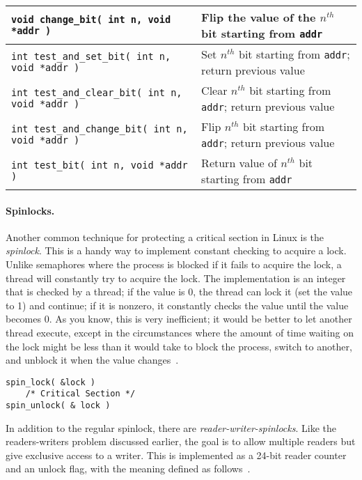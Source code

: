 \begin{center}
\begin{tabular}{l|l}
\texttt{void change\_bit( int n, void *addr )} &  Flip the value of the $n^{th}$ bit starting from \texttt{addr}\\\hline

\texttt{int test\_and\_set\_bit( int n, void *addr )} &  Set $n^{th}$ bit starting from \texttt{addr}; return previous value\\\hline

\texttt{int test\_and\_clear\_bit( int n, void *addr )} &  Clear $n^{th}$ bit starting from \texttt{addr}; return previous value\\\hline

\texttt{int test\_and\_change\_bit( int n, void *addr )} &  Flip $n^{th}$ bit starting from \texttt{addr}; return previous value\\\hline

\texttt{int test\_bit( int n, void *addr )} &  Return value of $n^{th}$ bit starting from \texttt{addr}\\\hline

\end{tabular}
\end{center}

\paragraph{Spinlocks.}
Another common technique for protecting a critical section in Linux is the \textit{spinlock}. This is a handy way to implement constant checking to acquire a lock. Unlike semaphores where the process is blocked if it fails to acquire the lock, a thread will constantly try to acquire the lock. The implementation is an integer that is checked by a thread; if the value is 0, the thread can lock it (set the value to 1) and continue; if it is nonzero, it constantly checks the value until the value becomes 0. As you know, this is very inefficient; it would be better to let another thread execute, except in the circumstances where the amount of time waiting on the lock might be less than it would take to block the process, switch to another, and unblock it when the value changes~\cite{osi}.

\begin{verbatim}
spin_lock( &lock )
    /* Critical Section */
spin_unlock( & lock )
\end{verbatim}

In addition to the regular spinlock, there are \textit{reader-writer-spinlocks}. Like the readers-writers problem discussed earlier, the goal is to allow multiple readers but give exclusive access to a writer. This is implemented as a 24-bit reader counter and an unlock flag, with the meaning defined as follows~\cite{osi}.

